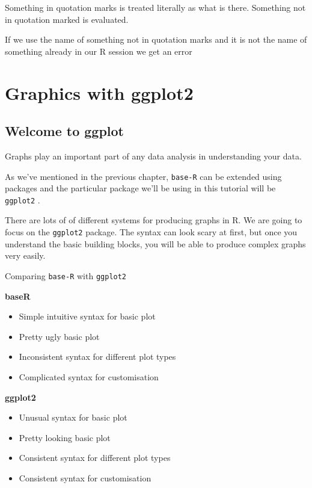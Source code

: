 \documentclass[]{book}
\providecommand{\tightlist}{%
  \setlength{\itemsep}{0pt}\setlength{\parskip}{0pt}}
\begin{document}
Something in quotation marks is treated literally as what is there.
Something not in quotation marked is evaluated.

If we use the name of something not in quotation marks and it is not the name of something already in our R session we get an error

\hypertarget{graphics-with-ggplot2}{%
\chapter{Graphics with ggplot2}\label{graphics-with-ggplot2}}

\hypertarget{welcome-to-ggplot}{%
\section{Welcome to ggplot}\label{welcome-to-ggplot}}

Graphs play an important part of any data analysis in understanding your data.

As we've mentioned in the previous chapter, \texttt{base-R} can be extended using packages and the particular package we'll be using in this tutorial will be \texttt{ggplot2} \citep{R-ggplot2}.

There are lots of of different systems for producing graphs in R. We are going to focus on the \texttt{ggplot2} package. The syntax can look scary at first, but once you understand the basic building blocks, you will be able to produce complex graphs very easily.

Comparing \texttt{base-R} with \texttt{ggplot2}

\textbf{baseR}

\begin{itemize}
\tightlist
\item
  Simple intuitive syntax for basic plot\\
\item
  Pretty ugly basic plot\\
\item
  Inconsistent syntax for different plot types\\
\item
  Complicated syntax for customisation
\end{itemize}

\textbf{ggplot2}

\begin{itemize}
\tightlist
\item
  Unusual syntax for basic plot\\
\item
  Pretty looking basic plot\\
\item
  Consistent syntax for different plot types\\
\item
  Consistent syntax for customisation
\end{itemize}
\end{document}
